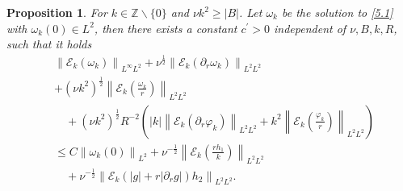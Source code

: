 \documentclass[final, 12pt,reqno]{amsart}
\newtheorem{proposition}[theorem]{\bf Proposition}
\numberwithin{equation}{section}
\begin{document}
\begin{proposition} \label{pro5.2}
    For $k \in \mathbb{Z} \backslash\{0\}$ and  $\nu k^2\geq |B|$. Let $\omega_k$ be the solution to \eqref{5.1} with $\omega_k(0) \in L^2$, then there exists a constant $c^{\prime}>0$ independent of $\nu, B, k, R$, such that it holds
    $$
    \begin{aligned}
        &   \left\|\mathcal{E}_k(\omega_k)\right\|_{L^\infty L^2}
        +\nu^{\frac{1}{2}}\left\|\mathcal{E}_k(\partial_{r}\omega_k)\right\|_{L^2L^2}\\
  &+(\nu k^2)^{\frac{1}{2}}\left\|\mathcal{E}_k(\frac{\omega_k}{r})\right\|_{L^2L^2}\\
  & \quad+(\nu k^2)^{\frac{1}{2}} R^{-2}\left(|k|\left\|\mathcal{E}_k(\partial_r \varphi_k)\right\|_{L^2 L^2}+k^2\left\|\mathcal{E}_k(\frac{\varphi_k}{r})\right\|_{L^2 L^2}\right) \\
        &\leq C\left\|\omega_k(0)\right\|_{L^2}+\nu^{-\frac{1}{2}}\left\|\mathcal{E}_k(\frac{rh_1}{k})\right\|_{L^2 L^2}\\
        &\quad+\nu^{-\frac{1}{2}}\left\|\mathcal{E}_k(|g|+r|\partial_{r}g|)h_2\right\|_{L^2L^2}.
    \end{aligned}
    $$
\end{proposition}
\end{document}
